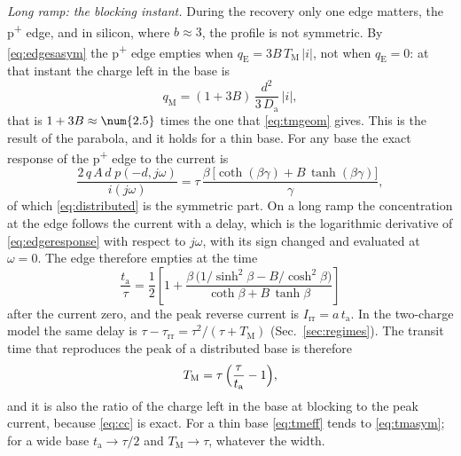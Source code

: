 \documentclass[10pt,a4paper]{scrartcl}
\newcommand{\Irr}{I_\mathrm{rr}}
\newcommand{\ta}{t_\mathrm{a}}
\newcommand{\taurr}{\tau_\mathrm{rr}}
\newcommand{\TM}{T_\mathrm{M}}
\newcommand{\qE}{q_\mathrm{E}}
\newcommand{\qM}{q_\mathrm{M}}
\newcommand{\Da}{D_\mathrm{a}}
\newcommand{\Pp}{p\textsuperscript{+}}
\begin{document}
\emph{Long ramp: the blocking instant.} During the recovery only one edge matters, the \Pp{} edge, and in silicon, where $b \approx 3$, the profile is not symmetric. By \eqref{eq:edgesasym} the \Pp{} edge empties when $\qE = 3B\,\TM\,|i|$, not when $\qE = 0$: at that instant the charge left in the base is
\begin{equation}
\qM = (1 + 3B)\,\frac{d^2}{3\,\Da}\,|i| ,
\label{eq:tmasym}
\end{equation}
that is $1 + 3B \approx \num{\pdTmAsymFactor}$ times the one that \eqref{eq:tmgeom} gives. This is the result of the parabola, and it holds for a thin base. For any base the exact response of the \Pp{} edge to the current is
\begin{equation}
\frac{2\,q\,A\,d\;p(-d,j\omega)}{i(j\omega)} = \tau\,\frac{\beta\,\bigl[\coth(\beta\gamma) + B\,\tanh(\beta\gamma)\bigr]}{\gamma} ,
\label{eq:edgeresponse}
\end{equation}
of which \eqref{eq:distributed} is the symmetric part. On a long ramp the concentration at the edge follows the current with a delay, which is the logarithmic derivative of \eqref{eq:edgeresponse} with respect to $j\omega$, with its sign changed and evaluated at $\omega = 0$. The edge therefore empties at the time
\begin{equation}
\frac{\ta}{\tau} = \frac12\left[1 + \frac{\beta\,\bigl(1/\sinh^2\beta - B/\cosh^2\beta\bigr)}{\coth\beta + B\,\tanh\beta}\right]
\label{eq:tadist}
\end{equation}
after the current zero, and the peak reverse current is $\Irr = a\,\ta$. In the two-charge model the same delay is $\tau - \taurr = \tau^2/(\tau+\TM)$ (Sec.~\ref{sec:regimes}). The transit time that reproduces the peak of a distributed base is therefore
\begin{equation}
\TM = \tau\,\Bigl(\frac{\tau}{\ta} - 1\Bigr) ,
\label{eq:tmeff}
\end{equation}
and it is also the ratio of the charge left in the base at blocking to the peak current, because \eqref{eq:cc} is exact. For a thin base \eqref{eq:tmeff} tends to \eqref{eq:tmasym}; for a wide base $\ta \to \tau/2$ and $\TM \to \tau$, whatever the width.
\end{document}

